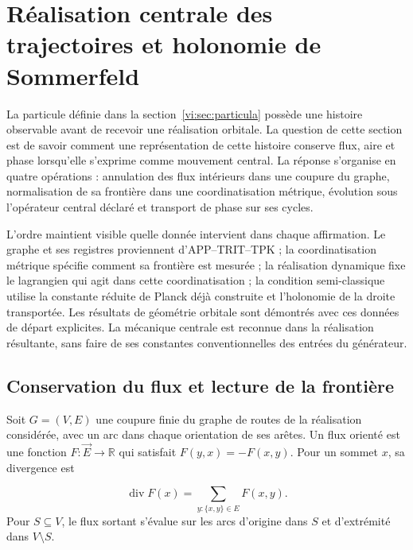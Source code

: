 \section{Réalisation centrale des trajectoires et holonomie de Sommerfeld
}
\label{vi:sec:kepler}

La particule définie dans la section~\ref{vi:sec:particula} possède
une histoire observable avant de recevoir une réalisation orbitale.
La question de cette section est de savoir comment une représentation de cette
histoire conserve flux, aire et phase lorsqu’elle s’exprime comme
mouvement central. La réponse s’organise en quatre opérations :
annulation des flux intérieurs dans une coupure du graphe,
normalisation de sa frontière dans une coordinatisation métrique, évolution sous
l’opérateur central déclaré et transport de phase sur ses cycles.


L’ordre maintient visible quelle donnée intervient dans chaque affirmation.
Le graphe et ses registres proviennent d’APP--TRIT--TPK ; la coordinatisation
métrique spécifie comment sa frontière est mesurée ; la réalisation dynamique
fixe le lagrangien qui agit dans cette coordinatisation ; la condition semi-classique
utilise la constante réduite de Planck déjà construite et l’holonomie
de la droite transportée. Les résultats de géométrie orbitale sont
démontrés avec ces données de départ explicites. La mécanique
centrale est reconnue dans la réalisation résultante, sans faire de ses
constantes conventionnelles des entrées du générateur.


\subsection{Conservation du flux et lecture de la frontière
}
\label{vi:subsec:gauss}

Soit $G=(V,E)$ une coupure finie du graphe de routes de la
réalisation considérée, avec un arc dans chaque orientation de ses
arêtes. Un flux orienté est une fonction
$F:\vec E\to\mathbb R$ qui satisfait
$F(y,x)=-F(x,y)$. Pour un sommet $x$, sa divergence est

\begin{equation}
 \operatorname{div}F(x)
 =\sum_{y:\{x,y\}\in E}F(x,y).
 \label{vi:eq:divergencia-grafo}
\end{equation}
Pour $S\subseteq V$, le flux sortant s’évalue sur les
arcs d’origine dans $S$ et d’extrémité dans $V\setminus S$.


